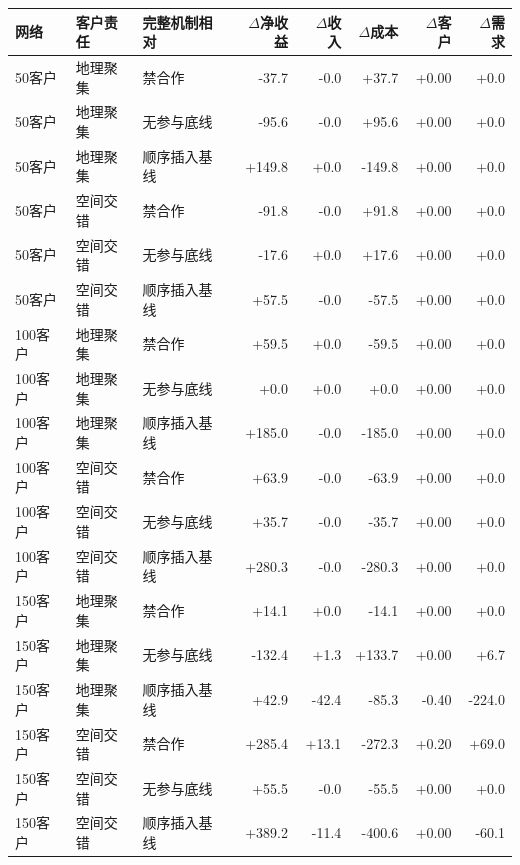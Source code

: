 \begin{tabular*}{0.99\linewidth}{@{\extracolsep{\fill}}lllrrrrr@{}}
\toprule
网络 & 客户责任 & 完整机制相对 & $\Delta$净收益 & $\Delta$收入 & $\Delta$成本 & $\Delta$客户 & $\Delta$需求 \\
\midrule
50客户 & 地理聚集 & 禁合作 & -37.7 & -0.0 & +37.7 & +0.00 & +0.0 \\
50客户 & 地理聚集 & 无参与底线 & -95.6 & -0.0 & +95.6 & +0.00 & +0.0 \\
50客户 & 地理聚集 & 顺序插入基线 & +149.8 & +0.0 & -149.8 & +0.00 & +0.0 \\
50客户 & 空间交错 & 禁合作 & -91.8 & -0.0 & +91.8 & +0.00 & +0.0 \\
50客户 & 空间交错 & 无参与底线 & -17.6 & +0.0 & +17.6 & +0.00 & +0.0 \\
50客户 & 空间交错 & 顺序插入基线 & +57.5 & -0.0 & -57.5 & +0.00 & +0.0 \\
100客户 & 地理聚集 & 禁合作 & +59.5 & +0.0 & -59.5 & +0.00 & +0.0 \\
100客户 & 地理聚集 & 无参与底线 & +0.0 & +0.0 & +0.0 & +0.00 & +0.0 \\
100客户 & 地理聚集 & 顺序插入基线 & +185.0 & -0.0 & -185.0 & +0.00 & +0.0 \\
100客户 & 空间交错 & 禁合作 & +63.9 & -0.0 & -63.9 & +0.00 & +0.0 \\
100客户 & 空间交错 & 无参与底线 & +35.7 & -0.0 & -35.7 & +0.00 & +0.0 \\
100客户 & 空间交错 & 顺序插入基线 & +280.3 & -0.0 & -280.3 & +0.00 & +0.0 \\
150客户 & 地理聚集 & 禁合作 & +14.1 & +0.0 & -14.1 & +0.00 & +0.0 \\
150客户 & 地理聚集 & 无参与底线 & -132.4 & +1.3 & +133.7 & +0.00 & +6.7 \\
150客户 & 地理聚集 & 顺序插入基线 & +42.9 & -42.4 & -85.3 & -0.40 & -224.0 \\
150客户 & 空间交错 & 禁合作 & +285.4 & +13.1 & -272.3 & +0.20 & +69.0 \\
150客户 & 空间交错 & 无参与底线 & +55.5 & -0.0 & -55.5 & +0.00 & +0.0 \\
150客户 & 空间交错 & 顺序插入基线 & +389.2 & -11.4 & -400.6 & +0.00 & -60.1 \\
\bottomrule
\end{tabular*}
